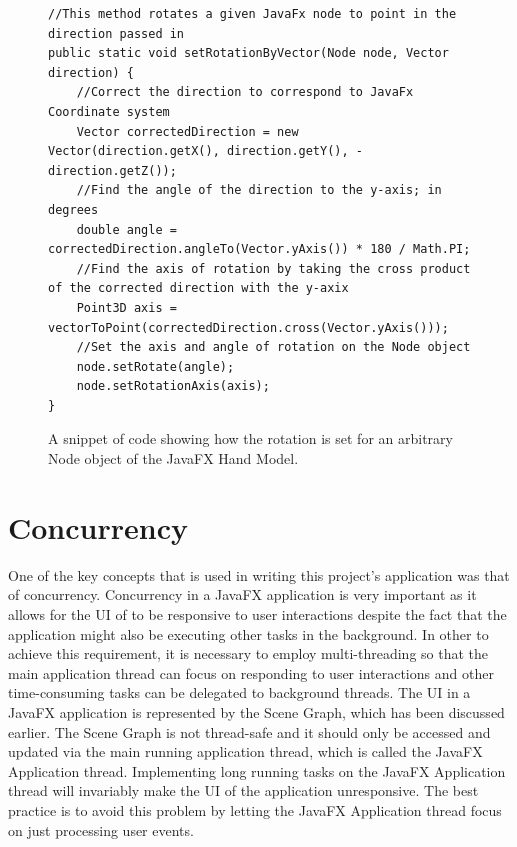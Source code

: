 \begin{figure}[th]
\centering
\begin{lstlisting}
//This method rotates a given JavaFx node to point in the direction passed in
public static void setRotationByVector(Node node, Vector direction) {
	//Correct the direction to correspond to JavaFx Coordinate system
	Vector correctedDirection = new Vector(direction.getX(), direction.getY(), -direction.getZ());
	//Find the angle of the direction to the y-axis; in degrees
	double angle = correctedDirection.angleTo(Vector.yAxis()) * 180 / Math.PI;
	//Find the axis of rotation by taking the cross product of the corrected direction with the y-axix
	Point3D axis = vectorToPoint(correctedDirection.cross(Vector.yAxis()));
	//Set the axis and angle of rotation on the Node object
	node.setRotate(angle);
	node.setRotationAxis(axis);
}
\end{lstlisting}
\caption[setRotationByVector Method]{A snippet of code showing how the rotation is set for an arbitrary Node object of the JavaFX Hand Model.}
\label{fig:setRotationByVectorCode}
\end{figure}




\section{Concurrency}
One of the key concepts that is used in writing this project's application was that of concurrency. Concurrency in a JavaFX application is very important as it allows for the UI of to be responsive to user interactions despite the fact that the application might also be executing other tasks in the background. In other to achieve this requirement, it is necessary to employ multi-threading so that the main application thread can focus on responding to user interactions and other time-consuming tasks can be delegated to background threads. The UI in a JavaFX application is represented by the Scene Graph, which has been discussed earlier. The Scene Graph is not thread-safe and it should only be accessed and updated via the main running application thread, which is called the JavaFX Application thread. Implementing long running tasks on the JavaFX Application thread will invariably make the UI of the application unresponsive. The best practice is to avoid this problem by letting the JavaFX Application thread focus on just processing user events. 


